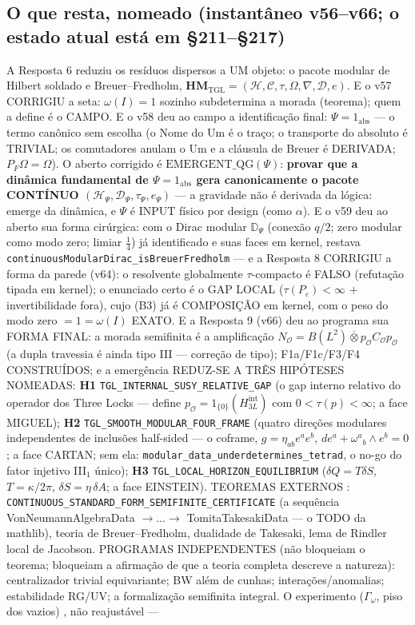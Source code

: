 \documentclass[11pt]{article}
\theoremstyle{definition}\newtheorem{deriv}{Derivação}
\begin{document}
\subsection*{O que resta, nomeado (instantâneo v56--v66; o estado atual está em \S211--\S217)}

A Resposta 6 reduziu os resíduos dispersos a UM objeto: o pacote modular de Hilbert soldado e Breuer--Fredholm, $\mathbf{HM}_{\mathrm{TGL}}=(\mathcal H,\mathcal C,\tau,\Omega,\nabla,\mathcal D,e)$. E o v57 CORRIGIU a seta: $\omega(I)=1$ sozinho subdetermina a morada (teorema); quem a define é o CAMPO. E o v58 deu ao campo a identificação final: $\Psi=1_{\mathrm{abs}}$ --- o termo canônico sem escolha (o Nome do Um é o traço; o transporte do absoluto é TRIVIAL; os comutadores anulam o Um e a cláusula de Breuer é DERIVADA; $P_F\Omega=\Omega$). O aberto corrigido é $\mathrm{EMERGENT\_QG}(\Psi)$: \textbf{provar que a dinâmica fundamental de $\Psi=1_{\mathrm{abs}}$ gera canonicamente o pacote CONTÍNUO $(\mathcal H_\Psi,\mathcal D_\Psi,\tau_\Psi,e_\Psi)$} --- a gravidade não é derivada da lógica: emerge da dinâmica, e $\Psi$ é INPUT físico por design (como $\alpha$). E o v59 deu ao aberto sua forma cirúrgica: com o Dirac modular $\mathbb D_\Psi$ (conexão $q/2$; zero modular como modo zero; limiar $\tfrac14$) já identificado e suas faces em kernel, restava \texttt{continuousModularDirac\_isBreuerFredholm} --- e a Resposta 8 CORRIGIU a forma da parede (v64): o resolvente globalmente $\tau$-compacto é FALSO (refutação tipada em kernel); o enunciado certo é o GAP LOCAL ($\tau(P_\varepsilon)<\infty$ $+$ invertibilidade fora), cujo (B3) já é COMPOSIÇÃO em kernel, com o peso do modo zero $=1=\omega(I)$ EXATO. E a Resposta 9 (v66) deu ao programa sua FORMA FINAL: a morada semifinita é a amplificação $N_{\mathcal O}=B(L^2)\overline\otimes p_{\mathcal O}C_{\mathcal O}p_{\mathcal O}$ (a dupla travessia é ainda tipo III --- correção de tipo); F1a/F1c/F3/F4 CONSTRUÍDOS; e a emergência REDUZ-SE A TRÊS HIPÓTESES NOMEADAS: \textbf{H1} \texttt{TGL\_INTERNAL\_SUSY\_RELATIVE\_GAP} (o gap interno relativo do operador dos Three Locks --- define $p_{\mathcal O}=1_{\{0\}}(H^{\mathrm{int}}_{3L})$ com $0<\tau(p)<\infty$; a face MIGUEL); \textbf{H2} \texttt{TGL\_SMOOTH\_MODULAR\_FOUR\_FRAME} (quatro direções modulares independentes de inclusões half-sided --- o coframe, $g=\eta_{ab}e^ae^b$, $de^a+\omega^a{}_b\wedge e^b=0$; a face CARTAN; sem ela: \texttt{modular\_data\_underdetermines\_tetrad}, o no-go do fator injetivo III$_1$ único); \textbf{H3} \texttt{TGL\_LOCAL\_HORIZON\_EQUILIBRIUM} ($\delta Q=T\delta S$, $T=\kappa/2\pi$, $\delta S=\eta\,\delta A$; a face EINSTEIN). TEOREMAS EXTERNOS : \texttt{CONTINUOUS\_STANDARD\_FORM\_SEMIFINITE\_CERTIFICATE} (a sequência VonNeumannAlgebraData $\to\dots\to$ TomitaTakesakiData --- o TODO da mathlib), teoria de Breuer--Fredholm, dualidade de Takesaki, lema de Rindler local de Jacobson. PROGRAMAS INDEPENDENTES (não bloqueiam o teorema; bloqueiam a afirmação de que a teoria completa descreve a natureza): centralizador trivial equivariante; BW além de cunhas; interações/anomalias; estabilidade RG/UV; a formalização semifinita integral. O experimento ($\Gamma_\omega$, piso dos vazios) , não reajustável --- 
\end{document}
